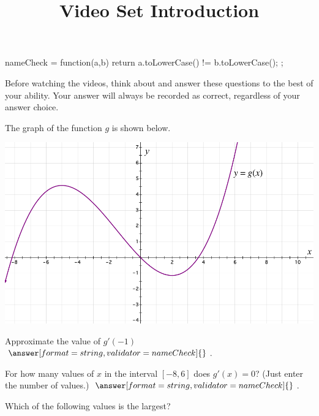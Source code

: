 \documentclass[handout]{ximera}
\title{Video Set Introduction}
\begin{document}
\begin{abstract}
\end{abstract}


\maketitle


\begin{javascript}
  nameCheck = function(a,b) {
    return a.toLowerCase() != b.toLowerCase();
  };
\end{javascript}

Before watching the videos, think about and answer these questions to the best of your ability. Your answer will always be recorded as correct, regardless of your answer choice.

The graph of the function $g$ is shown below.

\begin{image}
\includegraphics{Picture1.png}
\end{image}

\begin{problem}
Approximate the value of $g'(-1)$
$\answer[format=string,validator=nameCheck]{}$.
\end{problem}


\begin{problem}
For how many values of $x$ in the interval $[-8, 6]$ does $g'(x)=0$? (Just enter the number of values.)
$\answer[format=string,validator=nameCheck]{}$.
\end{problem}


\begin{problem}
Which of the following values is the largest?

\begin{multipleChoice}
\end{multipleChoice}

\end{problem}
\end{document}
